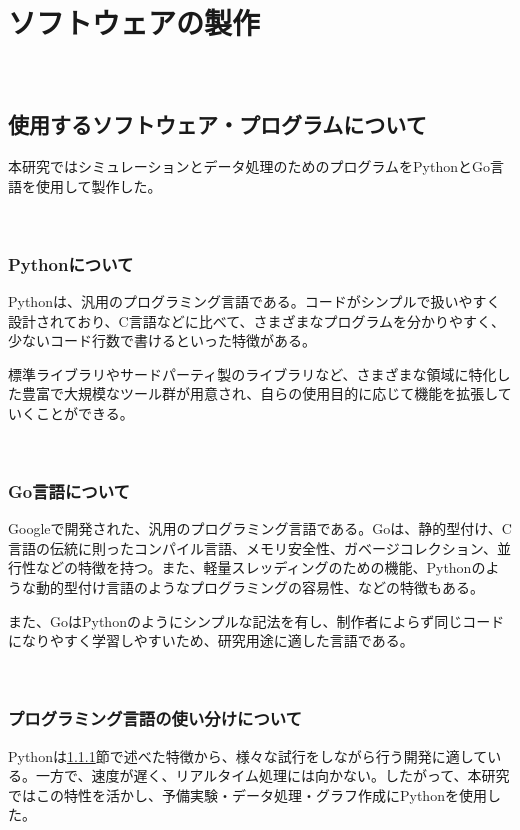 \chapter{ソフトウェアの製作}\label{software}

\
\section{使用するソフトウェア・プログラムについて}\label{about-program}

本研究ではシミュレーションとデータ処理のためのプログラムをPythonとGo言語を使用して製作した。

\
\subsection{Pythonについて}\label{about-python}

Pythonは、汎用のプログラミング言語である。コードがシンプルで扱いやすく設計されており、C言語などに比べて、さまざまなプログラムを分かりやすく、少ないコード行数で書けるといった特徴がある。

標準ライブラリやサードパーティ製のライブラリなど、さまざまな領域に特化した豊富で大規模なツール群が用意され、自らの使用目的に応じて機能を拡張していくことができる。


\
\subsection{Go言語について}\label{about-go}

Googleで開発された、汎用のプログラミング言語である。Goは、静的型付け、C言語の伝統に則ったコンパイル言語、メモリ安全性、ガベージコレクション、並行性などの特徴を持つ。また、軽量スレッディングのための機能、Pythonのような動的型付け言語のようなプログラミングの容易性、などの特徴もある。

また、GoはPythonのようにシンプルな記法を有し、制作者によらず同じコードになりやすく学習しやすいため、研究用途に適した言語である。

\
\subsection{プログラミング言語の使い分けについて}\label{about-proper-use}

Pythonは\ref{about-python}節で述べた特徴から、様々な試行をしながら行う開発に適している。一方で、速度が遅く、リアルタイム処理には向かない。したがって、本研究ではこの特性を活かし、予備実験・データ処理・グラフ作成にPythonを使用した。

